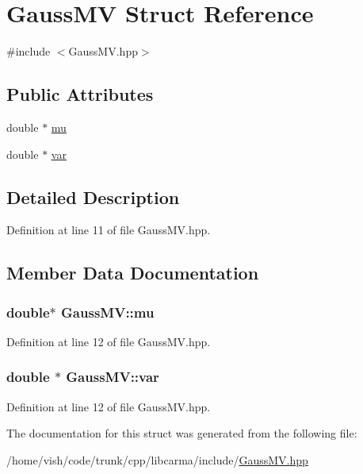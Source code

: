 \hypertarget{struct_gauss_m_v}{\section{Gauss\-M\-V Struct Reference}
\label{struct_gauss_m_v}
}


{\ttfamily \#include $<$Gauss\-M\-V.\-hpp$>$}

\subsection*{Public Attributes}
\begin{DoxyCompactItemize}
\item 
double $\ast$ \hyperlink{struct_gauss_m_v_ae45dad7a24aec8e56e0d2d9814a3f267}{mu}
\item 
double $\ast$ \hyperlink{struct_gauss_m_v_a4578d70691b74556849669fae207ff64}{var}
\end{DoxyCompactItemize}


\subsection{Detailed Description}


Definition at line 11 of file Gauss\-M\-V.\-hpp.



\subsection{Member Data Documentation}
\hypertarget{struct_gauss_m_v_ae45dad7a24aec8e56e0d2d9814a3f267}{
\subsubsection[{mu}]{\setlength{\rightskip}{0pt plus 5cm}double$\ast$ Gauss\-M\-V\-::mu}}\label{struct_gauss_m_v_ae45dad7a24aec8e56e0d2d9814a3f267}


Definition at line 12 of file Gauss\-M\-V.\-hpp.

\hypertarget{struct_gauss_m_v_a4578d70691b74556849669fae207ff64}{
\subsubsection[{var}]{\setlength{\rightskip}{0pt plus 5cm}double $\ast$ Gauss\-M\-V\-::var}}\label{struct_gauss_m_v_a4578d70691b74556849669fae207ff64}


Definition at line 12 of file Gauss\-M\-V.\-hpp.



The documentation for this struct was generated from the following file\-:\begin{DoxyCompactItemize}
\item 
/home/vish/code/trunk/cpp/libcarma/include/\hyperlink{_gauss_m_v_8hpp}{Gauss\-M\-V.\-hpp}\end{DoxyCompactItemize}
